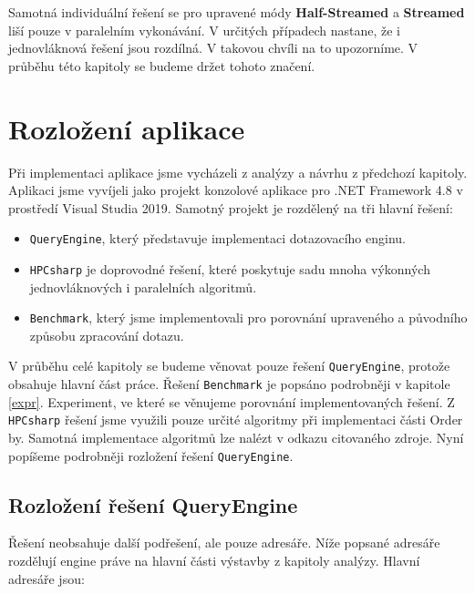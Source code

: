 Samotná individuální řešení se pro upravené módy \textbf{Half-Streamed} a \textbf{Streamed} liší pouze v paralelním vykonávání.
V určitých případech nastane, že i jednovláknová řešení jsou rozdílná.
V takovou chvíli na to upozorníme.
V průběhu této kapitoly se budeme držet tohoto značení.




\section{Rozložení aplikace}

Při implementaci aplikace jsme vycházeli z analýzy a návrhu z předchozí kapitoly.
Aplikaci jsme vyvíjeli jako projekt konzolové aplikace pro .NET Framework 4.8 v prostředí Visual Studia 2019.
Samotný projekt je rozdělený na tři hlavní řešení:

\begin{itemize}

\item \texttt{QueryEngine}, který představuje implementaci dotazovacího enginu.
\item \texttt{HPCsharp} \citep{hpcsharp} je doprovodné řešení, které poskytuje sadu mnoha výkonných jednovláknových i paralelních algoritmů.
\item \texttt{Benchmark}, který jsme implementovali pro porovnání upraveného a původního způsobu zpracování dotazu. 

\end{itemize}

V průběhu celé kapitoly se budeme věnovat pouze řešení \texttt{QueryEngine}, protože obsahuje hlavní část práce.
Řešení \texttt{Benchmark} je popsáno podrobněji v kapitole \ref{expr}. Experiment, ve které se věnujeme porovnání implementovaných řešení.
Z \texttt{HPCsharp} řešení jsme využili pouze určité algoritmy při implementaci části Order by.
Samotná implementace algoritmů lze nalézt v odkazu citovaného zdroje. 
Nyní popíšeme podrobněji rozložení řešení \texttt{QueryEngine}.

\subsection{Rozložení řešení QueryEngine}

Řešení neobsahuje další podřešení, ale pouze adresáře.
Níže popsané adresáře rozdělují engine práve na hlavní části výstavby z kapitoly analýzy.
Hlavní adresáře jsou:

